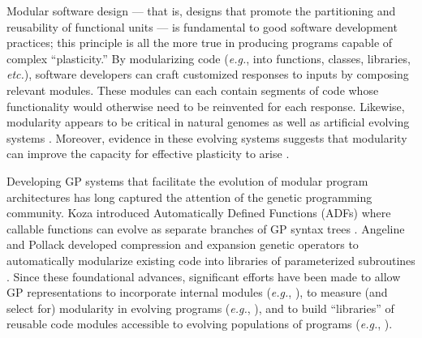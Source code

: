 Modular software design --- that is, designs that promote the partitioning and reusability of functional units --- is fundamental to good software development practices; this principle is all the more true in producing programs capable of complex ``plasticity.'' 
By modularizing code (\textit{e.g.}, into functions, classes, libraries, \textit{etc.}), software developers can craft customized responses to inputs by composing relevant modules.  
These modules can each contain segments of code whose functionality would otherwise need to be reinvented for each response.
Likewise, modularity appears to be critical in natural genomes \citep{wagner_road_2007} as well as artificial evolving systems \citep{huizinga_does_2016}.
Moreover, evidence in these evolving systems suggests that modularity can improve the capacity for effective plasticity to arise \citep{londe_phenotypic_2015,ellefsen_neural_2015}. %

Developing GP systems that facilitate the evolution of modular program architectures has long captured the attention of the genetic programming community. 
Koza introduced Automatically Defined Functions (ADFs) where callable functions can evolve as separate branches of GP syntax trees \citep{koza_genetic_1992,koza_genetic_1994}.
Angeline and Pollack developed compression and expansion genetic operators to automatically modularize existing code into libraries of parameterized subroutines \citep{angeline_evolutionary_1992}. 
Since these foundational advances, significant efforts have been made to allow GP representations to incorporate internal modules 
(\textit{e.g.},
\citep{spector_simultaneous_1996,oneill_grammar_2000,binard_abstraction-based_2007,walker_automatic_2008,spector_tag-based_2011,spector_tag-based_2012,lalejini_evolving_2018}),
to measure (and select for) modularity in evolving programs 
(\textit{e.g.}, \citep{krawiec_functional_2009,saini_modularity_2019,saini_using_modularity_2020}),
and to build ``libraries'' of reusable code modules accessible to evolving populations of programs
(\textit{e.g.}, \citep{rosca_learning_1994,banscherus_hierarchical_2001,keijzer_run_2004,keijzer_undirected_2005}).

